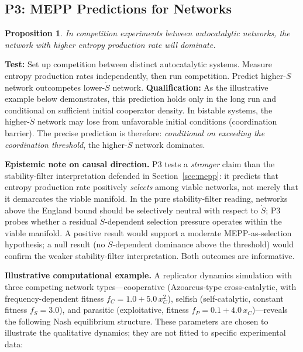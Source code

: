 \documentclass[12pt,a4paper]{article}
\newtheorem{proposition}{Proposition}
\theoremstyle{remark}
\begin{document}
\subsection{P3: MEPP Predictions for Networks}

\begin{proposition}
In competition experiments between autocatalytic networks, the network with higher entropy production rate will dominate.
\end{proposition}

\textbf{Test:} Set up competition between distinct autocatalytic systems. Measure entropy production rates independently, then run competition. Predict higher-$\dot{S}$ network outcompetes lower-$\dot{S}$ network. \textbf{Qualification:} As the illustrative example below demonstrates, this prediction holds only in the long run and conditional on sufficient initial cooperator density. In bistable systems, the higher-$\dot{S}$ network may lose from unfavorable initial conditions (coordination barrier). The precise prediction is therefore: \emph{conditional on exceeding the coordination threshold}, the higher-$\dot{S}$ network dominates.

\textbf{Epistemic note on causal direction.} P3 tests a \emph{stronger} claim than the stability-filter interpretation defended in Section~\ref{sec:mepp}: it predicts that entropy production rate positively \emph{selects} among viable networks, not merely that it demarcates the viable manifold. In the pure stability-filter reading, networks above the England bound should be selectively neutral with respect to $\dot{S}$; P3 probes whether a residual $\dot{S}$-dependent selection pressure operates within the viable manifold. A positive result would support a moderate MEPP-as-selection hypothesis; a null result (no $\dot{S}$-dependent dominance above the threshold) would confirm the weaker stability-filter interpretation. Both outcomes are informative.

\textbf{Illustrative computational example.} A replicator dynamics simulation with three competing network types---cooperative (Azoarcus-type cross-catalytic, with frequency-dependent fitness $f_C = 1.0 + 5.0\,x_C^2$), selfish (self-catalytic, constant fitness $f_S = 3.0$), and parasitic (exploitative, fitness $f_P = 0.1 + 4.0\,x_C$)---reveals the following Nash equilibrium structure. These parameters are chosen to illustrate the qualitative dynamics; they are not fitted to specific experimental data:
\end{document}
